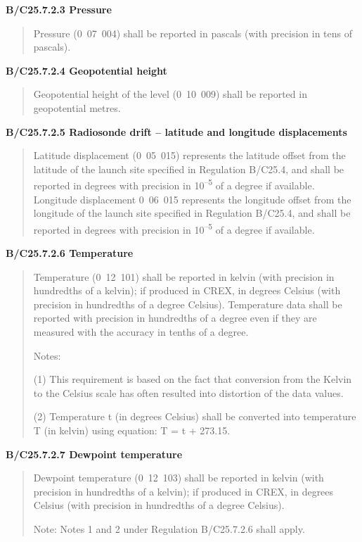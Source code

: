 \textbf{B/C25.7.2.3 Pressure}

\begin{quote}
Pressure (0~07~004) shall be reported in pascals (with precision in tens of pascals).
\end{quote}

\textbf{B/C25.7.2.4 Geopotential height}

\begin{quote}
Geopotential height of the level (0~10~009) shall be reported in geopotential metres.
\end{quote}

\textbf{B/C25.7.2.5 Radiosonde drift -- latitude and longitude displacements}

\begin{quote}
Latitude displacement (0~05~015) represents the latitude offset from the latitude of the launch site specified in Regulation B/C25.4, and shall be reported in degrees with precision in 10\textsuperscript{--5} of a degree if available. Longitude displacement 0~06~015 represents the longitude offset from the longitude of the launch site specified in Regulation B/C25.4, and shall be reported in degrees with precision in 10\textsuperscript{--5} of a degree if available.
\end{quote}

\textbf{B/C25.7.2.6 Temperature}

\begin{quote}
Temperature (0~12~101) shall be reported in kelvin (with precision in hundredths of a kelvin); if produced in CREX, in degrees Celsius (with precision in hundredths of a degree Celsius). Temperature data shall be reported with precision in hundredths of a degree even if they are measured with the accuracy in tenths of a degree.

Notes:

(1) This requirement is based on the fact that conversion from the Kelvin to the Celsius scale has often resulted into distortion of the data values.

(2) Temperature t (in degrees Celsius) shall be converted into temperature T (in kelvin) using equation: T = t + 273.15.
\end{quote}

\textbf{B/C25.7.2.7 Dewpoint temperature}

\begin{quote}
Dewpoint temperature (0~12~103) shall be reported in kelvin (with precision in hundredths of a kelvin); if produced in CREX, in degrees Celsius (with precision in hundredths of a degree Celsius).

Note: Notes 1 and 2 under Regulation B/C25.7.2.6 shall apply.
\end{quote}

